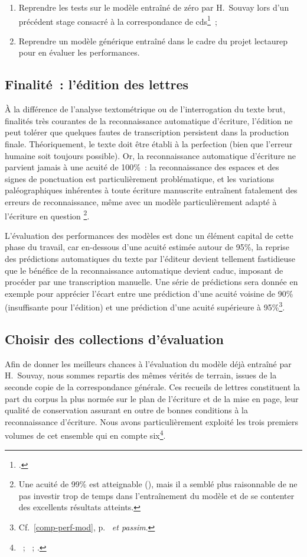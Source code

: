 \documentclass[a4paper,12pt,twoside]{book}
\begin{document}
				\begin{enumerate}
					\item Reprendre les tests sur le modèle entraîné de zéro par H.~Souvay lors d'un précédent stage consacré à la correspondance de \gls{cds}\footcite{souvayCorrespondanceConstanceSalm2021}~;
					\item Reprendre un modèle générique entraîné dans le cadre du projet \gls{lectaurep} pour en évaluer les performances.
				\end{enumerate}
		
			\subsection{Finalité~: l'édition des lettres}
				À la différence de l'analyse textométrique ou de l'interrogation du texte brut, finalités très courantes de la reconnaissance automatique d'écriture, l'édition ne peut tolérer que quelques fautes de transcription persistent dans la production finale. Théoriquement, le texte doit être établi à la perfection (bien que l'erreur humaine soit toujours possible). Or, la reconnaissance automatique d'écriture ne parvient jamais à une acuité de 100\%~: la reconnaissance des espaces et des signes de ponctuation est particulièrement problématique, et les variations paléographiques inhérentes à toute écriture manuscrite entraînent fatalement des erreurs de reconnaissance, même avec un modèle particulièrement adapté à l'écriture en question
				\footnote{Une acuité de 99\% est atteignable (\cite{stokesEScriptoriumVREManuscript2021}), mais il a semblé plus raisonnable de ne pas investir trop de temps dans l'entraînement du modèle et de se contenter des excellents résultats atteints.}.
				
				L'évaluation des performances des modèles est donc un élément capital de cette phase du travail, car en-dessous d'une acuité estimée autour de 95\%, la reprise des prédictions automatiques du texte par l'éditeur devient tellement fastidieuse que le bénéfice de la reconnaissance automatique devient caduc, imposant de procéder par une transcription manuelle. Une série de prédictions sera donnée en exemple pour apprécier l'écart entre une prédiction d'une acuité voisine de 90\% (insuffisante pour l'édition) et une prédiction d'une acuité supérieure à 95\%\footnote{Cf.~\ref{comp-perf-mod}, p.~\pageref{comp-perf-mod} \textit{et passim}.}.
				
			\subsection{Choisir des collections d'évaluation}
				Afin de donner les meilleurs chances à l'évaluation du modèle déjà entraîné par H.~Souvay, nous sommes repartis des mêmes vérités de terrain, issues de la seconde copie de la correspondance générale. Ces recueils de lettres constituent la part du corpus la plus normée sur le plan de l'écriture et de la mise en page, leur qualité de conservation assurant en outre de bonnes conditions à la reconnaissance d'écriture. Nous avons particulièrement exploité les trois premiers volumes de cet ensemble qui en compte six\footnote{\cite{CdS02001330}~; \cite{CdS02001369}~; \cite{CdS02001334}.}.
				
\end{document}
